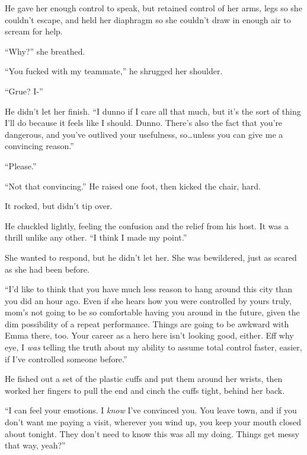 He gave her enough control to speak, but retained control of her arms, legs so she couldn't escape, and held her diaphragm so she couldn't draw in enough air to scream for help.



``Why?'' she breathed.



``You fucked with my teammate,'' he shrugged her shoulder.



``Grue?  I-''



He didn't let her finish.  ``I dunno if I care all that much, but it's the sort of thing I'll do because it feels like I should.  Dunno.  There's also the fact that you're dangerous, and you've outlived your usefulness, so\ldots unless you can give me a convincing reason.''



``Please.''



``Not that convincing.''  He raised one foot, then kicked the chair, hard.



It rocked, but didn't tip over.



He chuckled lightly, feeling the confusion and the relief from his host.  It was a thrill unlike any other.  ``I think I made my point.''



She wanted to respond, but he didn't let her.  She was bewildered, just as scared as she had been before.



``I'd like to think that you have much less reason to hang around this city than you did an hour ago.  Even if she hears how you were controlled by yours truly, mom's not going to be so comfortable having you around in the future, given the dim possibility of a repeat performance.  Things are going to be awkward with Emma there, too.  Your career as a hero here isn't looking good, either.  Eff why eye, I \emph{was} telling the truth about my ability to assume total control faster, easier, if I've controlled someone before.''



He fished out a set of the plastic cuffs and put them around her wrists, then worked her fingers to pull the end and cinch the cuffs tight, behind her back.



``I can feel your emotions.  I \emph{know} I've convinced you.  You leave town, and if you don't want me paying a visit, wherever you wind up, you keep your mouth closed about tonight.  They don't need to know this was all my doing.  Things get messy that way, yeah?''



